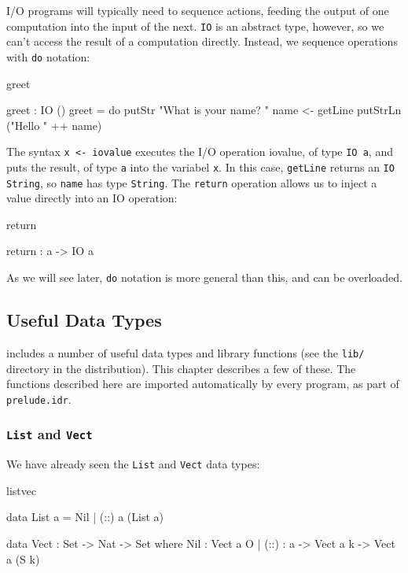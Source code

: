 I/O programs will typically need to sequence actions, feeding the output of one
computation into the input of the next. \texttt{IO} is an abstract type, however, so we
can't access the result of a computation directly. Instead, we sequence
operations with \texttt{do} notation:

\begin{SaveVerbatim}{greet}

greet : IO ()
greet = do { putStr "What is your name? "
             name <- getLine
             putStrLn ("Hello " ++ name)
           }

\end{SaveVerbatim}

\noindent
The syntax \texttt{x <- iovalue} executes the I/O operation iovalue, of type 
\texttt{IO a}, and
puts the result, of type \texttt{a} into the variabel \texttt{x}. 
In this case, \texttt{getLine} returns an \texttt{IO String},
so \texttt{name} has type \texttt{String}.
The \texttt{return} operation allows us to inject a value directly into an IO
operation:

\begin{SaveVerbatim}{return}

return : a -> IO a

\end{SaveVerbatim}

\noindent
As we will see later, \texttt{do} notation is more general than this, and can be
overloaded.

\subsection{Useful Data Types}

\Idris{} includes a number of useful data types and library functions (see the
\texttt{lib/} directory in the distribution). This chapter describes a few of these. The
functions described here are imported automatically by every \Idris{} program, as
part of \texttt{prelude.idr}.

\subsubsection{\texttt{List} and \texttt{Vect}}

We have already seen the \texttt{List} and \texttt{Vect} data types:

\begin{SaveVerbatim}{listvec}

data List a = Nil | (::) a (List a)

data Vect : Set -> Nat -> Set where
   Nil  : Vect a O
 | (::) : a -> Vect a k -> Vect a (S k)

\end{SaveVerbatim}

